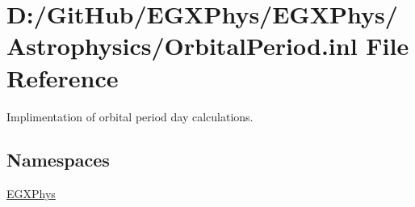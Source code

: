 \hypertarget{_orbital_period_8inl}{}\section{D\+:/\+Git\+Hub/\+E\+G\+X\+Phys/\+E\+G\+X\+Phys/\+Astrophysics/\+Orbital\+Period.inl File Reference}
\label{_orbital_period_8inl}


Implimentation of orbital period day calculations.  


\subsection*{Namespaces}
\begin{DoxyCompactItemize}
\item 
 \mbox{\hyperlink{namespace_e_g_x_phys}{E\+G\+X\+Phys}}
\end{DoxyCompactItemize}
